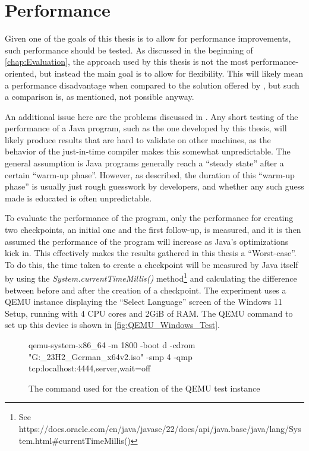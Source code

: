 \section{Performance}\label{sec:eval_performance}
Given one of the goals of this thesis is to allow for performance improvements,
such performance should be tested.
As discussed in the beginning of \autoref{chap:Evaluation},
the approach used by this thesis is not the most performance-oriented,
but instead the main goal is to allow for flexibility.
This will likely mean a performance disadvantage when compared to the solution offered by \citeauthor{kitcheckpoints},
but such a comparison is, as mentioned, not possible anyway.

An additional issue here are the problems \citeauthor{Java_Benchmarking} discussed in \cite{Java_Benchmarking}.
Any short testing of the performance of a Java program, such as the one developed by this thesis,
will likely produce results that are hard to validate on other machines,
as the behavior of the just-in-time compiler makes this somewhat unpredictable.
The general assumption is Java programs generally reach a \enquote{steady state} after a certain \enquote{warm-up phase}.
However, as \citeauthor{Java_Benchmarking} described, the duration of this \enquote{warm-up phase}
is usually just rough guesswork by developers,
and whether any such guess made is educated is often unpredictable\cite{Java_Benchmarking}.

To evaluate the performance of the program,
only the performance for creating two checkpoints,
an initial one and the first follow-up,
is measured, and it is then assumed the performance of the program will increase as Java's optimizations kick in.
This effectively makes the results gathered in this thesis a \enquote{Worst-case}.
To do this, the time taken to create a checkpoint will be measured by Java itself
by using the \emph{System.currentTimeMillis()} method\footnote{See https://docs.oracle.com/en/java/javase/22/docs/api/java.base/java/lang/System.html#currentTimeMillis()}
and calculating the difference between before and after the creation of a checkpoint.
The experiment uses a QEMU instance displaying the \enquote{Select Language} screen of the Windows 11 Setup,
running with 4 CPU cores and 2GiB of RAM.
The QEMU command to set up this device is shown in \autoref{fig:QEMU_Windows_Test}.

\begin{figure}[h]
    \begin{ffcode}
        qemu-system-x86_64 -m 1800 -boot d -cdrom "G:_23H2_German_x64v2.iso" -smp 4 -qmp tcp:localhost:4444,server,wait=off
    \end{ffcode}
    \label{fig:QEMU_Windows_Test}
    \caption{The command used for the creation of the QEMU test instance}
\end{figure}

